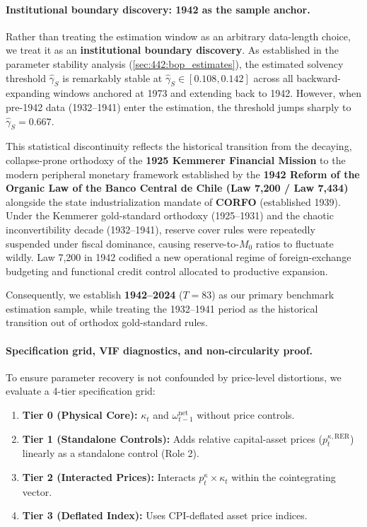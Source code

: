 \paragraph{Institutional boundary discovery: 1942 as the sample anchor.}
Rather than treating the estimation window as an arbitrary data-length choice, we treat it as an \textbf{institutional boundary discovery}. As established in the parameter stability analysis (\cref{sec:442:bop_estimates}), the estimated solvency threshold $\hat{\gamma}_S$ is remarkably stable at $\hat{\gamma}_S \in [0.108, 0.142]$ across all backward-expanding windows anchored at 1973 and extending back to 1942. However, when pre-1942 data (1932--1941) enter the estimation, the threshold jumps sharply to $\hat{\gamma}_S = 0.667$.

This statistical discontinuity reflects the historical transition from the decaying, collapse-prone orthodoxy of the \textbf{1925 Kemmerer Financial Mission} to the modern peripheral monetary framework established by the \textbf{1942 Reform of the Organic Law of the Banco Central de Chile (Law 7,200 / Law 7,434)} alongside the state industrialization mandate of \textbf{CORFO} (established 1939). Under the Kemmerer gold-standard orthodoxy (1925--1931) and the chaotic inconvertibility decade (1932--1941), reserve cover rules were repeatedly suspended under fiscal dominance, causing reserve-to-$M_0$ ratios to fluctuate wildly. Law 7,200 in 1942 codified a new operational regime of foreign-exchange budgeting and functional credit control allocated to productive expansion. 

Consequently, we establish \textbf{1942--2024} ($T = 83$) as our primary benchmark estimation sample, while treating the 1932--1941 period as the historical transition out of orthodox gold-standard rules.

\paragraph{Specification grid, VIF diagnostics, and non-circularity proof.}
To ensure parameter recovery is not confounded by price-level distortions, we evaluate a 4-tier specification grid:
\begin{enumerate}
	\item \textbf{Tier 0 (Physical Core):} $\kappa_t$ and $\omega^{\text{net}}_{t-1}$ without price controls.
	\item \textbf{Tier 1 (Standalone Controls):} Adds relative capital-asset prices ($p^{\kappa,\text{RER}}_t$) linearly as a standalone control (Role 2).
	\item \textbf{Tier 2 (Interacted Prices):} Interacts $p^{\kappa}_t \times \kappa_t$ within the cointegrating vector.
	\item \textbf{Tier 3 (Deflated Index):} Uses CPI-deflated asset price indices.
\end{enumerate}

